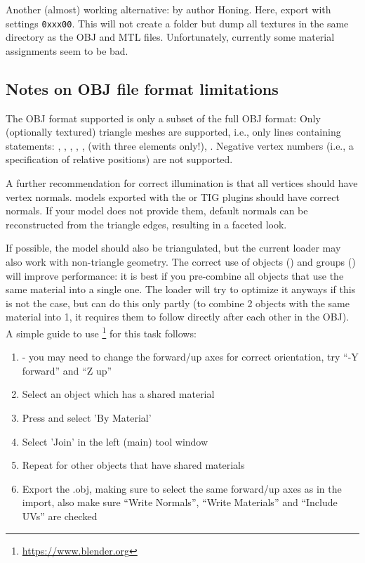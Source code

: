Another (almost) working alternative:  by author
Honing.  Here, export with settings \texttt{0xxx00}. This will not create a
 folder but dump all textures in the same directory as the OBJ
and MTL files. Unfortunately, currently some material assignments seem to be
bad.


\subsection{Notes on OBJ file format limitations}
\label{sec:scenery3d:OBJlimitations}

The OBJ format supported is only a subset of the full OBJ format: Only
(optionally textured) triangle meshes are supported, i.e., only lines containing
statements: , , , , , 
(with three elements only!), . Negative vertex numbers (i.e., a
specification of relative positions) are not supported.

A further recommendation for correct illumination is that all vertices should
have vertex normals.  models exported with the  or TIG plugins
should have correct normals. If your model does not provide them, default
normals can be reconstructed from the triangle edges, resulting in a faceted
look.

If possible, the model should also be triangulated, but the current loader may
also work with non-triangle geometry. 
The correct use of objects () and groups ()
will improve performance: it is best if you pre-combine all objects
that use the same material into a single one. The loader will try to
optimize it anyways if this is not the case, but can do this only
partly (to combine 2 objects with the same material into 1, it
requires them to follow directly after each other in the OBJ). A
simple guide to use
\footnote{\url{https://www.blender.org}} for this task
follows:

\begin{enumerate}
\item {} - you may need to change the forward/up axes for correct orientation, try ``-Y forward'' and ``Z up''
\item Select an object which has a shared material
\item Press  and select 'By Material'
\item Select 'Join' in the left (main) tool window
\item Repeat for other objects that have shared materials
\item Export the .obj, making sure to select the same forward/up axes as in the import, also make sure ``Write Normals'', ``Write Materials'' and ``Include UVs'' are checked
\end{enumerate}

